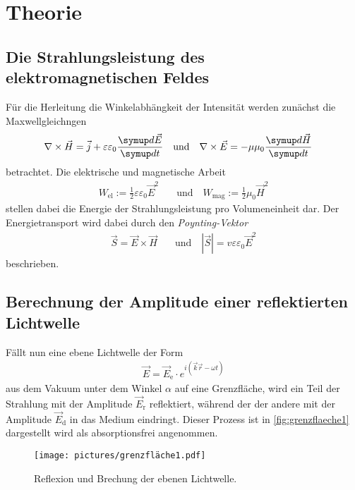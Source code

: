 \section{Theorie}
\label{sec:Theorie}


\subsection{Die Strahlungsleistung des elektromagnetischen Feldes}

Für die Herleitung die Winkelabhängkeit der Intensität werden zunächst die Maxwellgleichngen
\begin{align*}
    \nabla \times \vec{H}=\vec{j}+\varepsilon \varepsilon_{0} \frac{ \dif{\vec{E}}}{ \dif{t}} 
    \quad & \text{und} \quad 
    \nabla \times \vec{E}=-\mu \mu_{0} \frac{\dif{\vec{H}}}{\dif{t}} 
\end{align*}
betrachtet. Die elektrische und magnetische Arbeit
\begin{align*}
    W_{\text{el}}   :=  \frac{1}{2} \varepsilon \varepsilon_{0} \vec{E}^{2} 
    \quad & \text{und} \quad 
    W_{\text{mag}}  :=  \frac{1}{2} \mu_{0} \vec{H}^{2}
\end{align*}
stellen dabei die Energie der Strahlungsleistung pro Volumeneinheit dar.
Der Energietransport wird dabei durch den \textit{Poynting-Vektor} 
\begin{align} \label{eq:poynting}
    \vec{S}= \vec{E} \times \vec{H}
    \quad & \text{und} \quad
    |\vec{S}|= v \varepsilon \varepsilon_{0} \vec{E}^{2}
\end{align}
beschrieben.


\subsection{Berechnung der Amplitude einer reflektierten Lichtwelle}

Fällt nun eine ebene Lichtwelle der Form
\begin{align}
    \vec{E} = \vec{E}_\text{e} \cdot e^{i \left( \vec{k} \vec{r} - \omega t \right)}
\end{align}
aus dem Vakuum unter dem Winkel $\alpha$ auf eine Grenzfläche,
wird ein Teil der Strahlung mit der Amplitude $\vec{E}_\text{r}$ reflektiert,
während der der andere mit der Amplitude $\vec{E}_\text{d}$ in das Medium eindringt.
Dieser Prozess ist in \autoref{fig:grenzflaeche1} dargestellt wird als absorptionsfrei angenommen.
\begin{figure}
    \centering
    \texttt{[image: pictures/grenzfläche1.pdf]}
    \caption{Reflexion und Brechung der ebenen Lichtwelle. \cite{v407}}
    \label{fig:grenzflaeche1}
\end{figure}


